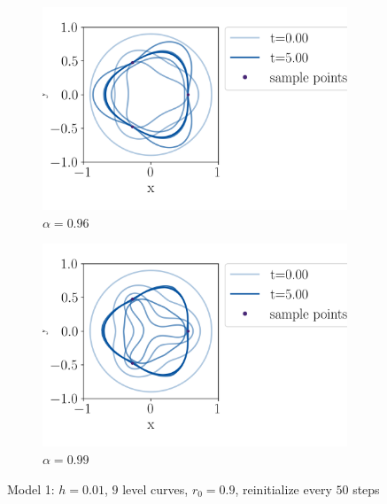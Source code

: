 \begin{figure}
    \centering
    \begin{subfigure}[h]{0.49\textwidth}
        \centering
        \includegraphics[width=\linewidth]{figures/Results/Three-points/model1/threepoints-a96.png}
        \caption{$\alpha=0.96$}
        \label{fig:m1-three-a96}
    \end{subfigure}%
    \begin{subfigure}[h]{0.49\textwidth}
        \centering
        \includegraphics[width=\linewidth]{figures/Results/Three-points/model1/threepoints-a99.png}
        \caption{$\alpha=0.99$}
        \label{fig:m1-three-a99}
    \end{subfigure}
\caption[Model 1 - Triangle, $\alpha=0.96$]{Model 1: $h=0.01$, $9$ level curves, $r_0=0.9$, reinitialize every $50$ steps}
\label{fig:m1-three-points}
\end{figure}


